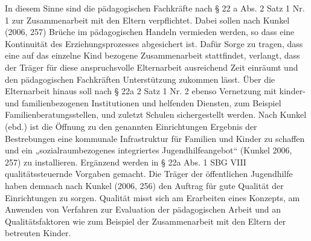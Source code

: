 In diesem Sinne sind die pädagogischen Fachkräfte nach § 22 a Abs. 2 Satz 1 Nr. 1 zur Zusammenarbeit mit den Eltern verpflichtet. Dabei sollen nach Kunkel (2006, 257) Brüche im pädagogischen Handeln vermieden werden, so dass eine Kontinuität des Erziehungsprozesses abgesichert ist. Dafür Sorge zu tragen, dass eine auf das einzelne Kind bezogene Zusammenarbeit stattfindet, verlangt, dass der Träger für diese anspruchsvolle Elternarbeit ausreichend Zeit einräumt und den pädagogischen Fachkräften Unterstützung zukommen lässt. Über die Elternarbeit hinaus soll nach § 22a 2 Satz 1 Nr. 2 ebenso Vernetzung mit kinder- und familienbezogenen Institutionen und helfenden Diensten, zum Beispiel Familienberatungsstellen, und zuletzt Schulen sichergestellt werden. Nach Kunkel (ebd.) ist die Öffnung zu den genannten Einrichtungen Ergebnis der Bestrebungen eine kommunale Infrastruktur für Familien und Kinder zu schaffen und ein „sozialraumbezogenes integriertes Jugendhilfeangebot“ (Kunkel 2006, 257) zu installieren. Ergänzend werden in § 22a Abs. 1 SBG VIII qualitätssteuernde Vorgaben gemacht. Die Träger der öffentlichen Jugendhilfe haben demnach nach Kunkel (2006, 256) den Auftrag für gute Qualität der Einrichtungen zu sorgen. Qualität misst sich am Erarbeiten eines Konzepts, am Anwenden von Verfahren zur Evaluation der pädagogischen Arbeit und an Qualitätsfaktoren wie zum Beispiel der Zusammenarbeit mit den Eltern der betreuten Kinder.

